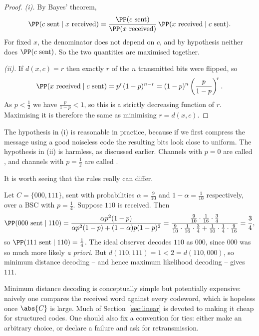\begin{proof}
	\emph{(i).} By Bayes' theorem,
	$$\PP(c \text{ sent} \mid x \text{ received}) = \frac{\PP(c \text{ sent})}{\PP(x \text{ received})}\,\PP(x \text{ received}\mid c \text{ sent}).$$
	For fixed $x$, the denominator does not depend on $c$, and by hypothesis neither does $\PP(c \text{ sent})$. So the two quantities are maximised together.

	\emph{(ii).} If $d(x,c) = r$ then exactly $r$ of the $n$ transmitted bits were flipped, so
	$$\PP(x \text{ received} \mid c \text{ sent}) = p^r(1-p)^{n-r} = (1-p)^n\left(\frac{p}{1-p}\right)^{\!r}.$$
	As $p < \tfrac12$ we have $\frac{p}{1-p} < 1$, so this is a strictly decreasing function of $r$. Maximising it is therefore the same as minimising $r = d(x,c)$.
\end{proof}

The hypothesis in (i) is reasonable in practice, because if we first compress the message using a good noiseless code the resulting bits look close to uniform. The hypothesis in (ii) is harmless, as discussed earlier. Channels with $p = 0$ are called , and channels with $p = \tfrac12$ are called .

It is worth seeing that the rules really can differ.

\begin{example}
	Let $C = \{000, 111\}$, sent with probabilities $\alpha = \tfrac9{10}$ and $1-\alpha = \tfrac1{10}$ respectively, over a BSC with $p = \tfrac14$. Suppose $110$ is received. Then
	$$\PP(000 \text{ sent} \mid 110) = \frac{\alpha p^2(1-p)}{\alpha p^2 (1-p) + (1-\alpha)p(1-p)^2} = \frac{\tfrac9{10}\cdot \tfrac1{16}\cdot\tfrac34}{\tfrac9{10}\cdot\tfrac1{16}\cdot\tfrac34 + \tfrac1{10}\cdot\tfrac14\cdot\tfrac9{16}} = \frac34,$$
	so $\PP(111 \text{ sent} \mid 110) = \tfrac14$. The ideal observer decodes $110$ as $000$, since $000$ was so much more likely \emph{a priori}. But $d(110,111) = 1 < 2 = d(110,000)$, so minimum distance decoding -- and hence maximum likelihood decoding -- gives $111$.
\end{example}

\begin{remark}
	Minimum distance decoding is conceptually simple but potentially expensive: naively one compares the received word against every codeword, which is hopeless once $\abs{C}$ is large. Much of Section~\ref{sec:linear} is devoted to making it cheap for structured codes. One should also fix a convention for ties: either make an arbitrary choice, or declare a failure and ask for retransmission.
\end{remark}

